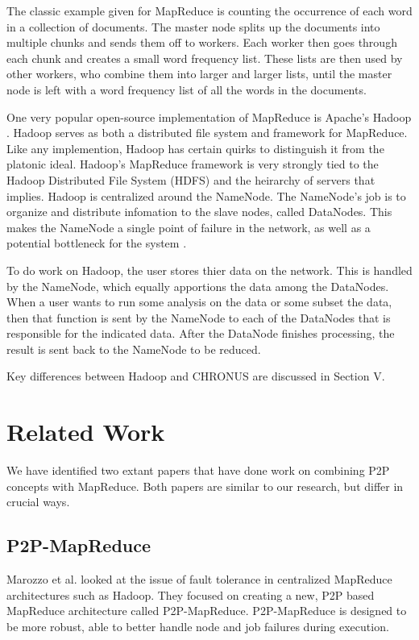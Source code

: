 \documentclass[conference, compsocconf, letterpaper]{IEEEtran}
\begin{document}
The classic example given for MapReduce is counting the occurrence of each word in a collection of documents.  The master node splits up the documents into multiple chunks and sends them off to workers.  Each worker then goes through each chunk and creates a small word frequency list.  These lists are then used by other workers, who combine them into larger and larger lists, until the master node is left with a word frequency list of all the words in the documents. 

One very popular open-source implementation of MapReduce is Apache's Hadoop \cite{Hadoop}.  Hadoop serves as both a distributed file system and framework for MapReduce\cite{shvachko2010hadoop}.  Like any implemention, Hadoop has certain quirks to distinguish it from the platonic ideal.  Hadoop's MapReduce framework is very strongly tied to the Hadoop Distributed File System (HDFS) and the heirarchy of servers that implies.  Hadoop is centralized around the NameNode.  The NameNode's job is to organize and distribute infomation to the slave nodes, called DataNodes.  This makes the NameNode a single point of failure \cite{shvachko2010hadoop} in the network, as well as a potential bottleneck for the system \cite{hadoop-bottle}.

To do work on Hadoop, the user stores thier data on the network.  This is handled by the NameNode, which equally apportions the data among the DataNodes.  When a user wants to run some analysis on the data or some subset the data, then that function is sent by the NameNode to each of the DataNodes that is responsible for the indicated data.   After the DataNode finishes processing, the result is sent back to the NameNode to be reduced.

Key differences between Hadoop and CHRONUS are discussed in Section V.


\section{Related Work}

We have identified two extant papers that have done work on combining P2P concepts with MapReduce.  Both papers are similar to our research, but differ in crucial ways.

\subsection{P2P-MapReduce}
Marozzo et al. \cite{marozzo2012p2p} looked at the issue of fault tolerance in centralized MapReduce architectures such as Hadoop.  They focused on creating a new, P2P based MapReduce architecture called P2P-MapReduce.  P2P-MapReduce is designed to be more robust, able to better handle node and job failures during execution.
\end{document}
